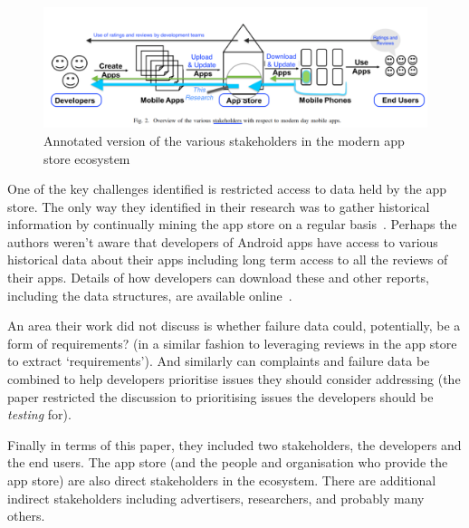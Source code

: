 \begin{figure}
    \centering
    \includegraphics[width=\linewidth]{images/related-work/future-trends-in-sweng-for-mobile-apps-fig-2-annotated-with-highlights.pdf}
    \caption[Various stakeholders in the modern app store ecosystem, adapted from~\cite{nagappan2016_future_trends_in_sw_eng_for_mobile_apps}]{Annotated version of the various stakeholders in the modern app store ecosystem~\cite{nagappan2016_future_trends_in_sw_eng_for_mobile_apps}}
    \label{fig:nagappan2016_future_trends_in_sw_eng_for_mobile_apps_figure_2_annotated}
\end{figure}
 

One of the key challenges identified is restricted access to data held by the app store. The only way they identified in their research was to gather historical information by continually mining the app store on a regular basis~. Perhaps the authors weren't aware that developers of Android apps have access to various historical data about their apps including long term access to all the reviews of their apps. Details of how developers can download these and other reports, including the data structures, are available online~.

An area their work did not discuss is whether failure data could, potentially, be a form of requirements? (in a similar fashion to leveraging reviews in the app store to extract `requirements'). And similarly can complaints and failure data be combined to help developers prioritise issues they should consider addressing (the paper restricted the discussion to prioritising issues the developers should be \emph{testing} for).

Finally in terms of this paper, they included two stakeholders, the developers and the end users. The app store (and the people and organisation who provide the app store) are also direct stakeholders in the ecosystem. There are additional indirect stakeholders including advertisers, researchers, and probably many others. 

